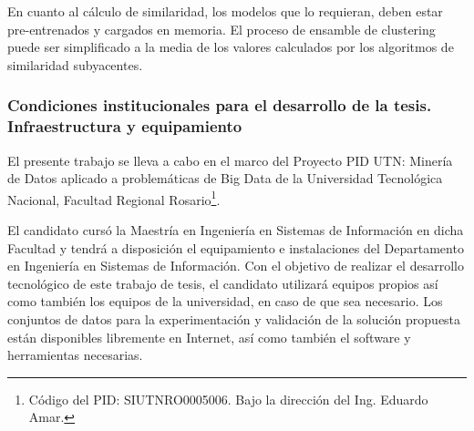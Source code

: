 \bigskip En cuanto al cálculo de similaridad, los modelos que lo requieran, deben estar pre-entrenados y cargados en memoria. El proceso de ensamble de clustering puede ser simplificado a la media de los valores calculados por los algoritmos de similaridad subyacentes.

\subsubsection{Condiciones institucionales para el desarrollo de la tesis. Infraestructura y equipamiento}
El presente trabajo se lleva a cabo en el marco del Proyecto PID UTN: Minería de Datos aplicado a problemáticas de Big Data de la Universidad Tecnológica Nacional, Facultad Regional Rosario\footnote{Código del PID: SIUTNRO0005006. Bajo la dirección del Ing. Eduardo Amar.}.

\bigskip El candidato cursó la Maestría en Ingeniería en Sistemas de Información en dicha Facultad y tendrá a disposición el equipamiento e instalaciones del Departamento en Ingeniería en Sistemas de Información. Con el objetivo de realizar el desarrollo tecnológico de este trabajo de tesis, el candidato utilizará equipos propios así como también los equipos de la universidad, en caso de que sea necesario. Los conjuntos de datos para la experimentación y validación de la solución propuesta están disponibles libremente en Internet, así como también el software y herramientas necesarias.

















